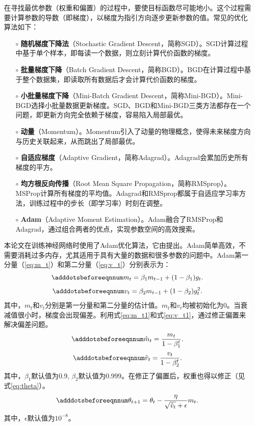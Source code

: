在寻找最优参数（权重和偏置）的过程中，要使目标函数尽可能地小。这个过程需要计算参数的导数（即梯度），以梯度为指引方向逐步更新参数的值。常见的优化算法如下：
\begin{itemize}
  \item[$\circ$] \textbf{随机梯度下降法}（Stochastic Gradient Descent，简称SGD）。SGD计算过程中基于单个样本，即每读一个数据，则立刻计算代价函数的梯度。
  \item[$\circ$] \textbf{批量梯度下降}（Batch Gradient Descent，简称BGD）。BGD在计算过程中基于整个数据集，即读取所有数据后才会计算代价函数的梯度。
  \item[$\circ$] \textbf{小批量梯度下降}（Mini-Batch Gradient Descent，简称Mini-BGD）。Mini-BGD选择小批量数据更新梯度。SGD、BGD和Mini-BGD三类方法都存在一个问题，即更新方向完全依赖于梯度，容易陷入局部最优。
  \item[$\circ$] \textbf{动量}（Momentum）。Momentum引入了动量的物理概念，使得未来梯度方向与历史关联起来，从而跳出了局部最优。
  \item[$\circ$] \textbf{自适应梯度}（Adaptive Gradient，简称Adagrad）。Adagrad会累加历史所有梯度的平方。
  \item[$\circ$] \textbf{均方根反向传播}（Root Mean Square Propagation，简称RMSprop）。MSProp计算所有梯度的平均值。Adagrad和RMSprop都属于自适应学习率方法，训练过程中的步长（即学习率）时刻在调整。
  \item[$\circ$] \textbf{Adam}（Adaptive Moment Estimation）。Adam融合了RMSProp和Adagrad，通过组合两者的优点，实现参数空间的高效搜索。
\end{itemize}

本论文在训练神经网络时使用了Adam优化算法，它由\citet{kingma2014adam}提出。Adam简单高效，不需要消耗过多内存，尤其适用于具有大量的数据和很多参数的问题中。Adam第一分量（\ref{eq:m_t}）和第二分量（\ref{eq:v_t}）分别表示为：
\begin{equation}\adddotsbeforeeqnnum 
  \label{eq:m_t}
  m_t = \beta_1 m_{t-1}+(1-\beta_1)g_t.
\end{equation}
\begin{equation}\adddotsbeforeeqnnum 
  \label{eq:v_t}
  v_t = \beta_2 m_{t-1}+(1-\beta_2)g^2_t.
\end{equation}
其中，$m_t$和$v_t$分别是第一分量和第二分量的估计值。$m_t$和$v_t$均被初始化为0。当衰减值很小时，梯度会出现偏差。利用式\ref{eq:m_t1}和式\ref{eq:v_t1}，通过修正偏置来解决偏差问题。
\begin{equation}\adddotsbeforeeqnnum 
  \label{eq:m_t1}
  \hat{m}_t = \frac{m_t}{1-\beta_1^t}.
\end{equation}
\begin{equation}\adddotsbeforeeqnnum 
  \label{eq:v_t1}
  \hat{v}_t = \frac{v_t}{1-\beta_2^t}.
\end{equation}
其中，$\beta_1$默认值为$0.9$, $\beta_2$默认值为$0.999$。在修正了偏置后，权重也得以修正（见式\ref{eq:theta}）。
\begin{equation}\adddotsbeforeeqnnum 
  \label{eq:theta}
  \theta_{t+1}=\theta_t-\frac{\eta}{\sqrt{\hat{v}_t}+\epsilon}m_t.
\end{equation}
其中，$\epsilon$默认值为$10^{-8}$。

